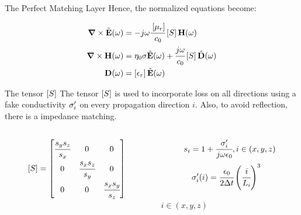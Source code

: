 \documentclass{beamer}
\begin{document}
\begin{frame}{The Perfect Matching Layer}
  Hence, the normalized equations become:

  \begin{align}
      \rot \Enw (\omega) &= -j\omega\cfrac{\brackets{\mu_r}}{c_0} \brackets{S} \Hh (\omega) \\
      \rot \Hh (\omega) &= \eta_0 \sigma \Enw(\omega) + \cfrac{j\omega}{c_0}\brackets{S} \Dnw (\omega) \\
      \D (\omega) &= \brackets{\epsilon _r} \Enw (\omega)
  \end{align}

\end{frame}

\begin{frame}{The tensor $\brackets{S}$}
  The tensor $\brackets{S}$ is used to incorporate loss on all directions using a fake conductivity $\sigma_i^{\prime}$ on every propagation direction $i$. Also, to avoid reflection, there is a impedance matching.

  \begin{columns}
    
    \begin{column}{0.5\textwidth}
      
    \begin{equation}
      \brackets{S} = \begin{bmatrix}
          \cfrac{s_ys_z}{s_x} & 0 & 0 \\
          0 & \cfrac{s_xs_z}{s_y} & 0 \\
          0 & 0 & \cfrac{s_xs_y}{s_z}
      \end{bmatrix}
    \end{equation}

    \end{column}

    \begin{column}{0.5\textwidth}
      
      \begin{align}
        s_i = 1 + \cfrac{\sigma_i^{\prime}}{j\omega\epsilon_0}, i \in (x, y, z)
      \end{align}      
      \begin{align}
        \sigma_i\Prime(i) &= \cfrac{\epsilon_0}{2\dt}\pare{\cfrac{i}{L_i}}^3
      \end{align}
      
      \centering
      $i \in (x, y, z)$

    \end{column}

  \end{columns}

\end{frame}
\end{document}
